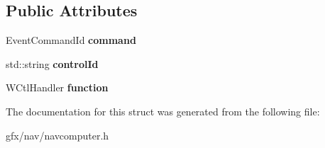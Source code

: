 \subsection*{Public Attributes}
\begin{DoxyCompactItemize}
\item 
Event\+Command\+Id {\bfseries command}\hypertarget{structNavComputer_1_1WctlTableEntry_afcadc0659bb26f968a9d5730a95d27d8}{}\label{structNavComputer_1_1WctlTableEntry_afcadc0659bb26f968a9d5730a95d27d8}

\item 
std\+::string {\bfseries control\+Id}\hypertarget{structNavComputer_1_1WctlTableEntry_a7a8aa5442baf822e6dfc9ed4f0110fb6}{}\label{structNavComputer_1_1WctlTableEntry_a7a8aa5442baf822e6dfc9ed4f0110fb6}

\item 
W\+Ctl\+Handler {\bfseries function}\hypertarget{structNavComputer_1_1WctlTableEntry_a06a8c5d6c6efa4c0085e03612beb8655}{}\label{structNavComputer_1_1WctlTableEntry_a06a8c5d6c6efa4c0085e03612beb8655}

\end{DoxyCompactItemize}


The documentation for this struct was generated from the following file\+:\begin{DoxyCompactItemize}
\item 
gfx/nav/navcomputer.\+h\end{DoxyCompactItemize}
